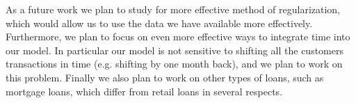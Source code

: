\documentclass[sigconf]{acmart}
\begin{document}
As a future work we plan to study for more effective method of regularization, which would allow us to use the data we have available more effectively.
Furthermore, we plan to focus on even more effective ways to integrate time into our model. In particular our model is not sensitive to shifting all the customers transactions in time (e.g. shifting by one month back), and we plan to work on this problem.
Finally we also plan to work on other types of loans, such as mortgage loans, which differ from retail loans in several respects.



\end{document}
